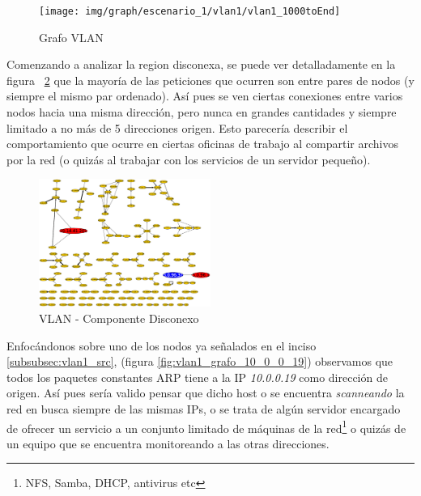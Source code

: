 \begin{figure}
    \centering
    \texttt{[image: img/graph/escenario\_1/vlan1/vlan1\_1000toEnd]}
    \caption{Grafo VLAN }
    \label{fig:vlan1_grafo}
\end{figure}

\newpage
\par Comenzando a analizar la region disconexa, se puede ver detalladamente en la figura
~\ref{fig:vlan1_grafo_unconexed} que la mayor\'ia de las peticiones que ocurren son entre
pares de nodos (y siempre el mismo par ordenado). As\'i pues se ven ciertas conexiones
entre varios nodos hacia una misma direcci\'on, pero nunca en grandes cantidades y siempre
limitado a no m\'as de 5 direcciones origen. Esto parecer\'ia describir el comportamiento
que ocurre en ciertas oficinas de trabajo al compartir archivos por la red (o quiz\'as al
trabajar con los servicios de un servidor peque\~no).

\begin{figure}[!htb]
    \centering
    \includegraphics[width=0.5\textwidth]{img/graph/escenario_1/vlan1/vlan1_1000toEnd_unconexed}
    \caption{VLAN  - Componente Disconexo}
    \label{fig:vlan1_grafo_unconexed}
\end{figure}


\par Enfoc\'andonos sobre uno de los nodos ya se\~nalados en el inciso \ref{subsubsec:vlan1_src},
(figura \ref{fig:vlan1_grafo_10_0_0_19})
observamos que todos los paquetes constantes ARP tiene a la IP \textit{10.0.0.19} como direcci\'on
de origen. As\'i pues ser\'ia valido pensar que dicho host o se encuentra \textit{scanneando} la
red en busca siempre de las mismas IPs, o se trata de alg\'un servidor encargado de ofrecer
un servicio a un conjunto limitado de m\'aquinas de la red\footnote{NFS, Samba, DHCP, antivirus etc} o
quiz\'as de un equipo que se encuentra monitoreando a las otras direcciones.

